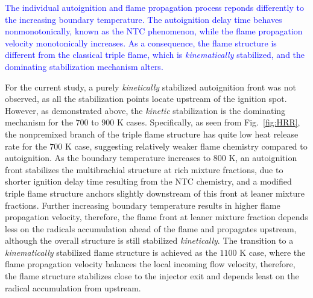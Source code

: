 \documentclass[review,3p,times]{elsarticleUS}
\begin{document}
\textcolor{blue}{The individual autoignition and flame propagation process reponds differently to the increasing boundary temperature.  The autoignition delay time behaves nonmonotonically, known as the NTC phenomenon, while the flame propagation velocity monotonically increases.  As a consequence, the flame structure is different from the classical triple flame, which is \emph{kinematically} stabilized, and the dominating stabilization mechanism alters.}   

For the current study, a purely \emph {kinetically} stabilized autoignition front was not observed, as all the stabilization points locate upstream of the ignition spot.  However, as demonstrated above, the \emph {kinetic} stabilization is the dominating mechanism for the $700$ to $900$ K cases.  Specifically, as seen from Fig.~\ref{fig:HRR}, the nonpremixed branch of the triple flame structure has quite low heat release rate for the $700$ K case, suggesting relatively weaker flame chemistry compared to autoignition.  As the boundary temperature increases to $800$ K, an autoignition front stabilizes the multibrachial structure at rich mixture fractions, due to shorter ignition delay time resulting from the NTC chemistry, and a modified triple flame structure anchors slightly downstream of this front at leaner mixture fractions.  Further increasing boundary temperature results in higher flame propagation velocity, therefore, the flame front at leaner mixture fraction depends less on the radicals accumulation ahead of the flame and propagates upstream, although the overall structure is still stabilized \emph {kinetically}.  The transition to a \emph {kinematically} stabilized flame structure is achieved as the $1100$ K case, where the flame propagation velocity balances the local incoming flow velocity, therefore, the flame structure stabilizes close to the injector exit and depends least on the radical accumulation from upstream.  
\end{document}
